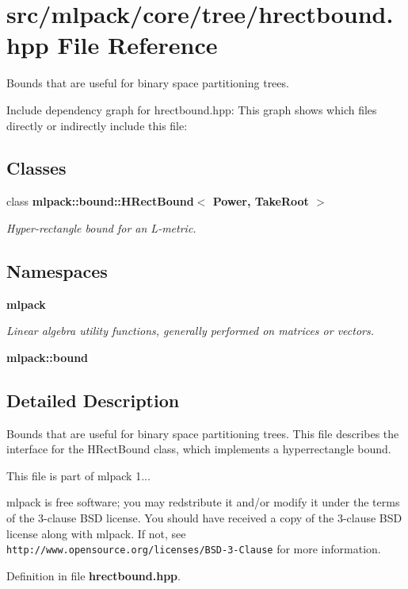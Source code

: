 \section{src/mlpack/core/tree/hrectbound.hpp File Reference}
\label{hrectbound_8hpp}


Bounds that are useful for binary space partitioning trees.  


Include dependency graph for hrectbound.\-hpp\-:
This graph shows which files directly or indirectly include this file\-:
\subsection*{Classes}
\begin{DoxyCompactItemize}
\item 
class {\bf mlpack\-::bound\-::\-H\-Rect\-Bound$<$ Power, Take\-Root $>$}
\begin{DoxyCompactList}\small\item\em Hyper-\/rectangle bound for an L-\/metric. \end{DoxyCompactList}\end{DoxyCompactItemize}
\subsection*{Namespaces}
\begin{DoxyCompactItemize}
\item 
{\bf mlpack}
\begin{DoxyCompactList}\small\item\em Linear algebra utility functions, generally performed on matrices or vectors. \end{DoxyCompactList}\item 
{\bf mlpack\-::bound}
\end{DoxyCompactItemize}


\subsection{Detailed Description}
Bounds that are useful for binary space partitioning trees. This file describes the interface for the H\-Rect\-Bound class, which implements a hyperrectangle bound.

This file is part of mlpack 1...

mlpack is free software; you may redstribute it and/or modify it under the terms of the 3-\/clause B\-S\-D license. You should have received a copy of the 3-\/clause B\-S\-D license along with mlpack. If not, see {\tt http\-://www.\-opensource.\-org/licenses/\-B\-S\-D-\/3-\/\-Clause} for more information. 

Definition in file {\bf hrectbound.\-hpp}.

